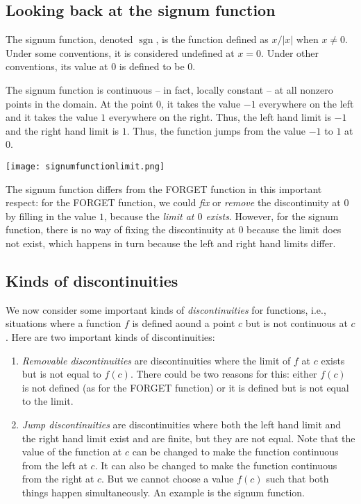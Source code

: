 \documentclass[10pt]{amsart}
\begin{document}
\subsection{Looking back at the signum function}

The signum function, denoted $\operatorname{sgn}$, is the function
defined as $x/|x|$ when $x \ne 0$. Under some conventions, it is
considered undefined at $x = 0$. Under other conventions, its value at
$0$ is defined to be $0$.

The signum function is continuous -- in fact, locally constant -- at
all nonzero points in the domain. At the point $0$, it takes the value
$-1$ everywhere on the left and it takes the value $1$ everywhere on
the right. Thus, the left hand limit is $-1$ and the right hand limit
is $1$. Thus, the function jumps from the value $-1$ to $1$ at $0$.

\texttt{[image: signumfunctionlimit.png]}

The signum function differs from the FORGET function in this important
respect: for the FORGET function, we could {\em fix} or {\em remove}
the discontinuity at $0$ by filling in the value $1$, because the {\em
limit at $0$ exists}. However, for the signum function, there is no
way of fixing the discontinuity at $0$ because the limit does not
exist, which happens in turn because the left and right hand limits
differ.

\subsection{Kinds of discontinuities}

We now consider some important kinds of {\em discontinuities} for
functions, i.e., situations where a function $f$ is defined aound a
point $c$ but is not continuous at $c$. Here are two important kinds
of discontinuities:

\begin{enumerate}
\item {\em Removable discontinuities} are discontinuities where the
  limit of $f$ at $c$ exists but is not equal to $f(c)$. There could
  be two reasons for this: either $f(c)$ is not defined (as for the
  FORGET function) or it is defined but is not equal to the limit.
\item {\em Jump discontinuities} are discontinuities where both the
  left hand limit and the right hand limit exist and are finite, but
  they are not equal. Note that the value of the function at $c$ can
  be changed to make the function continuous from the left at $c$. It
  can also be changed to make the function continuous from the right
  at $c$. But we cannot choose a value $f(c)$ such that both things
  happen simultaneously. An example is the signum function.
\end{enumerate}
\end{document}
